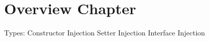 \chapter{Overview Chapter}\label{ch:template-chapter}

Types:
Constructor Injection
Setter Injection
Interface Injection
